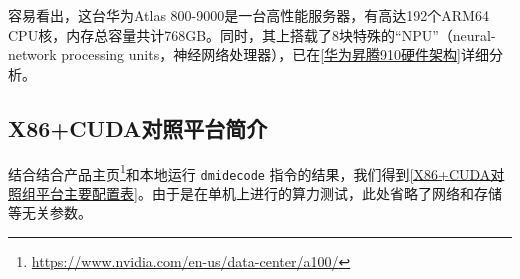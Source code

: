 容易看出，这台华为Atlas 800-9000是一台高性能服务器，有高达192个ARM64 CPU核，内存总容量共计768GB。同时，其上搭载了8块特殊的``NPU''（neural-network processing units，神经网络处理器），已在\autoref{华为昇腾910硬件架构}详细分析。

\subsection{X86+CUDA对照平台简介}

结合结合产品主页\footnote{\url{https://www.nvidia.com/en-us/data-center/a100/}}和本地运行 \lstinline{dmidecode} 指令的结果，我们得到\autoref{X86+CUDA对照组平台主要配置表}。由于是在单机上进行的算力测试，此处省略了网络和存储等无关参数。

\begin{table}[h] %
    \centering
    \caption{X86+CUDA对照组平台主要配置表}
    \label{X86+CUDA对照组平台主要配置表}
\end{table}

